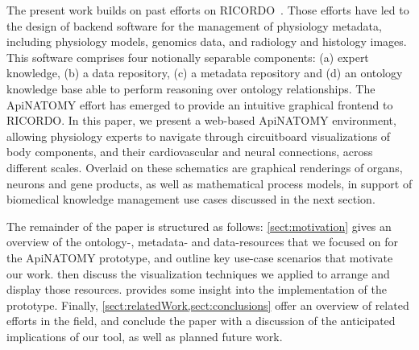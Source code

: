 The present work builds on past efforts on RICORDO~\cite{BHW+11}. Those efforts have led to the design of backend software for the management of physiology metadata, including physiology models, genomics data, and radiology and histology images. This software comprises four notionally separable components: (a) expert knowledge, (b) a data repository, (c) a metadata repository and (d) an ontology knowledge base able to perform reasoning over ontology relationships.
The ApiNATOMY effort has emerged to provide an intuitive graphical frontend to RICORDO. In this paper, we present a web-based ApiNATOMY environment, allowing physiology experts to navigate through circuitboard visualizations of body components, and their cardiovascular and neural connections, across different scales. Overlaid on these schematics are graphical renderings of organs, neurons and gene products,
as well as mathematical process models, in support of biomedical knowledge management use cases discussed in the next section.

The remainder of the paper is structured as follows: \cref{sect:motivation} gives an overview of the \mbox{ontology-,} metadata- and data-resources that we focused on for the ApiNATOMY prototype, and outline key use-case scenarios that motivate our work.  then discuss the visualization techniques we applied to arrange and display those resources.  provides some insight into the implementation of the prototype. Finally, \cref{sect:relatedWork,sect:conclusions} offer an overview of related efforts in the field, and conclude the paper with a discussion of the anticipated implications of our tool, as well as planned future work.
